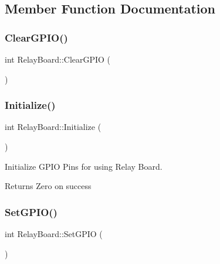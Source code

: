 \subsection{Member Function Documentation}
\mbox{\label{classRelayBoard_a0dcfab8a5d558c5af4f8deeee510d314}} 
\subsubsection{\texorpdfstring{Clear\+G\+P\+I\+O()}{ClearGPIO()}}
{\footnotesize\ttfamily int Relay\+Board\+::\+Clear\+G\+P\+IO (\begin{DoxyParamCaption}{ }\end{DoxyParamCaption})}

\mbox{\label{classRelayBoard_a49759cb3cdcb6c2ccd7fbb44eb34b260}} 
\subsubsection{\texorpdfstring{Initialize()}{Initialize()}}
{\footnotesize\ttfamily int Relay\+Board\+::\+Initialize (\begin{DoxyParamCaption}{ }\end{DoxyParamCaption})\hspace{0.3cm}{\ttfamily [private]}}

Initialize G\+P\+IO Pins for using Relay Board.

\begin{DoxyReturn}{Returns}
Zero on success 
\end{DoxyReturn}
\mbox{\label{classRelayBoard_a681cd840b5406b0f5d285b4aed94ef2c}} 
\subsubsection{\texorpdfstring{Set\+G\+P\+I\+O()}{SetGPIO()}}
{\footnotesize\ttfamily int Relay\+Board\+::\+Set\+G\+P\+IO (\begin{DoxyParamCaption}{ }\end{DoxyParamCaption})}



